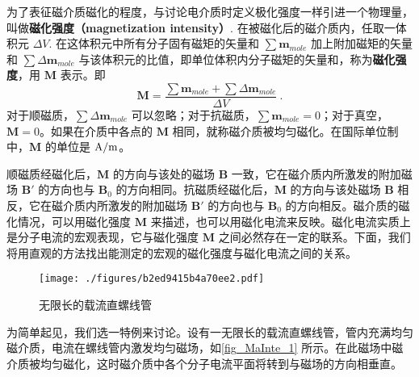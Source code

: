 
为了表征磁介质磁化的程度，与讨论电介质时定义极化强度一样引进一个物理量，叫做\textbf{磁化强度（magnetization intensity）}. 在被磁化后的磁介质内，任取一体积元 $\Delta V$. 在这体积元中所有分子固有磁矩的矢量和 $\sum \mathbf{m}_{mole}$ 加上附加磁矩的矢量和 $\sum \Delta\mathbf{m}_{mole}$ 与该体积元的比值，即单位体积内分子磁矩的矢量和，称为\textbf{磁化强度}，用 $\mathbf M$ 表示。即
\begin{equation}\label{eq_MaInte_2}
\mathbf M=\frac{\sum \mathbf m_{mole}+\sum \Delta \mathbf m_{mole}}{\Delta V}~.
\end{equation}
对于顺磁质，$\sum \Delta\mathbf{m}_{mole}$ 可以忽略；对于抗磁质，$\sum \mathbf{m}_{mole}=0$；对于真空，$\mathbf M=0$。如果在介质中各点的 $\mathbf M $ 相同，就称磁介质被均匀磁化。在国际单位制中，$\mathbf M$ 的单位是 $\rm A/m$。

顺磁质经磁化后，$\mathbf M $ 的方向与该处的磁场 $\mathbf B $ 一致，它在磁介质内所激发的附加磁场 $\mathbf B' $ 的方向也与 $\mathbf B_0$ 的方向相同。抗磁质经磁化后，$\mathbf M $ 的方向与该处磁场 $\mathbf B $ 相反，它在磁介质内所激发的附加磁场 $\mathbf B' $ 的方向也与 $\mathbf B_0 $ 的方向相反。磁介质的磁化情况，可以用磁化强度 $\mathbf M $ 来描述，也可以用磁化电流来反映。磁化电流实质上是分子电流的宏观表现，它与磁化强度 $\mathbf M $ 之间必然存在一定的联系。下面，我们将用直观的方法找出能测定的宏观的磁化强度与磁化电流之间的关系。
\begin{figure}[ht]
\centering
\texttt{[image: ./figures/b2ed9415b4a70ee2.pdf]}
\caption{无限长的载流直螺线管} \label{fig_MaInte_1}
\end{figure}
为简单起见，我们选一特例来讨论。设有一无限长的载流直螺线管，管内充满均匀磁介质，电流在螺线管内激发均匀磁场，如\autoref{fig_MaInte_1} 所示。在此磁场中磁介质被均匀磁化，这时磁介质中各个分子电流平面将转到与磁场的方向相垂直。

